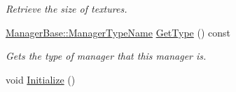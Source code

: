 \begin{DoxyCompactItemize}
\begin{DoxyCompactList}\small\item\em Retrieve the size of textures. \item\end{DoxyCompactList}\item 
\hyperlink{classMezzanine_1_1ManagerBase_a08cecf5169cad3e82be81a3a159b0b6e}{ManagerBase::ManagerTypeName} \hyperlink{classMezzanine_1_1SceneManager_ad10c4317af4a2c6fbbfc151e8c609570}{GetType} () const 
\begin{DoxyCompactList}\small\item\em Gets the type of manager that this manager is. \item\end{DoxyCompactList}\item 
\hypertarget{classMezzanine_1_1SceneManager_a8a3b5cb55a06669d0fe64510c1b1a854}{
void \hyperlink{classMezzanine_1_1SceneManager_a8a3b5cb55a06669d0fe64510c1b1a854}{Initialize} ()}
\label{classMezzanine_1_1SceneManager_a8a3b5cb55a06669d0fe64510c1b1a854}


\end{DoxyCompactItemize}
